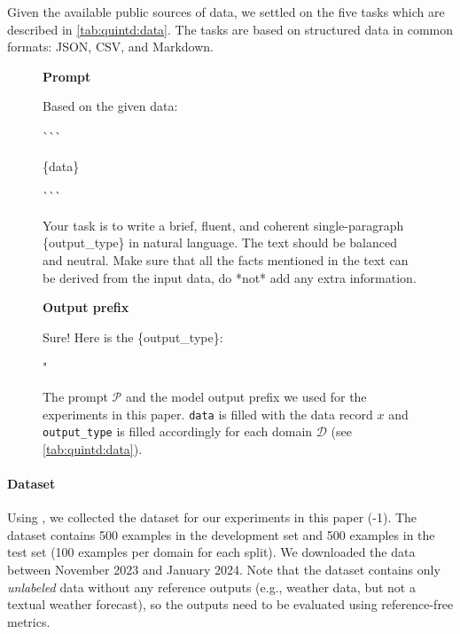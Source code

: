 Given the available public sources of data, we settled on the five tasks which are described in \autoref{tab:quintd:data}. The tasks are based on structured data in common formats: JSON, CSV, and Markdown.


\begin{figure}[t]
    \centering
    \small
    \textbf{Prompt}
    \begin{verbatimbox}
        Based on the given data:

        \`{}\`{}\`{}

        \{data\}

        \`{}\`{}\`{}

        Your task is to write a brief, fluent, and
        coherent single-paragraph \{output\_type\} in natural
        language. The text should be balanced and neutral.
        Make sure that all the facts mentioned in the text
        can be derived from the input data, do *not* add
        any extra information.
    \end{verbatimbox}
    \textbf{Output prefix}
    \begin{verbatimbox}
        Sure! Here is the \{output\_type\}:

        "
    \end{verbatimbox}
    \caption[The prompt and the model output prefix.]{The prompt $\mathcal{P}$ and the model output prefix we used for the experiments in this paper. \texttt{data} is filled with the data record  $x$ and \texttt{output\_type} is filled accordingly for each domain $\mathcal{D}$ (see \autoref{tab:quintd:data}).}
    \label{fig:quintd:prompt}
\end{figure}


\paragraph{\benchmark{} Dataset}
\label{sec:quintd:dataset}
Using \datatool{}, we collected the dataset for our experiments in this paper (\datatool{}-1). The dataset contains 500 examples in the development set and 500 examples in the test set (100 examples per domain for each split).
We downloaded the data between November 2023 and January 2024. Note that the dataset contains only \emph{unlabeled} data without any reference outputs (e.g., weather data, but not a textual weather forecast), so the outputs need to be evaluated using reference-free metrics.



